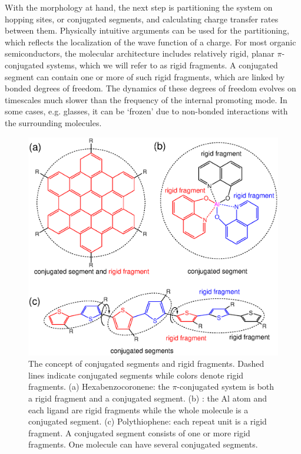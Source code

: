 With the morphology at hand, the next step is partitioning the system on hopping sites, or conjugated segments, and calculating charge transfer rates between them. Physically intuitive arguments can be used for the partitioning,  which reflects the localization of the wave function of a charge. For most organic semiconductors, the molecular architecture includes relatively rigid, planar $\pi$-conjugated systems, which we will refer to as rigid fragments. A conjugated segment can contain one or more of such rigid fragments, which are linked by bonded degrees of freedom. The dynamics of these degrees of freedom evolves on timescales much slower than the frequency of the internal promoting mode. In some cases, e.g. glasses, it can be `frozen' due to non-bonded interactions with the surrounding molecules.

\begin{figure}
\includegraphics[width=\linewidth]{fig/conjugated_segment/fragment_segment}
\caption{\small The concept of conjugated segments and rigid fragments. Dashed lines indicate conjugated segments while colors denote rigid fragments. (a) Hexabenzocoronene: the $\pi$-conjugated system is both a rigid fragment and a conjugated segment. (b) \Alq: the Al atom and each ligand are rigid fragments while the whole molecule is a conjugated segment. (c) Polythiophene: each repeat unit is a rigid fragment. A conjugated segment consists of one or more rigid fragments. One molecule can have several conjugated segments.}
\label{fig:segment}
\end{figure}


